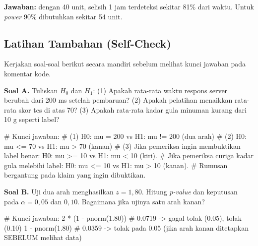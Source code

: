 \documentclass[
  indonesian,
  letterpaper,
]{book}
\newenvironment{Shaded}{\begin{snugshade}}{\end{snugshade}}
\newcommand{\CommentTok}[1]{\textcolor[rgb]{0.37,0.37,0.37}{#1}}
\newcommand{\DecValTok}[1]{\textcolor[rgb]{0.68,0.00,0.00}{#1}}
\newcommand{\FloatTok}[1]{\textcolor[rgb]{0.68,0.00,0.00}{#1}}
\newcommand{\FunctionTok}[1]{\textcolor[rgb]{0.28,0.35,0.67}{#1}}
\newcommand{\NormalTok}[1]{\textcolor[rgb]{0.00,0.23,0.31}{#1}}
\newcommand{\SpecialCharTok}[1]{\textcolor[rgb]{0.37,0.37,0.37}{#1}}
\begin{document}
\textbf{Jawaban:} dengan 40 unit, selisih 1 jam terdeteksi sekitar 81\%
dari waktu. Untuk \emph{power} 90\% dibutuhkan sekitar 54 unit.

\subsection{Latihan Tambahan
(Self-Check)}\label{latihan-tambahan-self-check-1}

Kerjakan soal-soal berikut secara mandiri sebelum melihat kunci jawaban
pada komentar kode.

\textbf{Soal A.} Tuliskan \(H_0\) dan \(H_1\): (1) Apakah rata-rata
waktu respons server berubah dari 200 ms setelah pembaruan? (2) Apakah
pelatihan menaikkan rata-rata skor tes di atas 70? (3) Apakah rata-rata
kadar gula minuman kurang dari 10 g seperti label?

\begin{Shaded}
\begin{Highlighting}[]
\CommentTok{\# Kunci jawaban:}
\CommentTok{\# (1) H0: mu = 200 vs H1: mu != 200 (dua arah)}
\CommentTok{\# (2) H0: mu \textless{}= 70 vs H1: mu \textgreater{} 70 (kanan)}
\CommentTok{\# (3) Jika pemeriksa ingin membuktikan label benar: H0: mu \textgreater{}= 10 vs H1: mu \textless{} 10 (kiri).}
\CommentTok{\#     Jika pemeriksa curiga kadar gula melebihi label: H0: mu \textless{}= 10 vs H1: mu \textgreater{} 10 (kanan).}
\CommentTok{\#     Rumusan bergantung pada klaim yang ingin dibuktikan.}
\end{Highlighting}
\end{Shaded}

\textbf{Soal B.} Uji dua arah menghasilkan \(z = 1{,}80\). Hitung
\emph{p-value} dan keputusan pada \(\alpha = 0{,}05\) dan \(0{,}10\).
Bagaimana jika ujinya satu arah kanan?

\begin{Shaded}
\begin{Highlighting}[]
\CommentTok{\# Kunci jawaban:}
\DecValTok{2} \SpecialCharTok{*}\NormalTok{ (}\DecValTok{1} \SpecialCharTok{{-}} \FunctionTok{pnorm}\NormalTok{(}\FloatTok{1.80}\NormalTok{))   }\CommentTok{\# 0.0719 {-}\textgreater{} gagal tolak (0.05), tolak (0.10)}
\DecValTok{1} \SpecialCharTok{{-}} \FunctionTok{pnorm}\NormalTok{(}\FloatTok{1.80}\NormalTok{)         }\CommentTok{\# 0.0359 {-}\textgreater{} tolak pada 0.05 (jika arah kanan ditetapkan SEBELUM melihat data)}
\end{Highlighting}
\end{Shaded}
\end{document}
